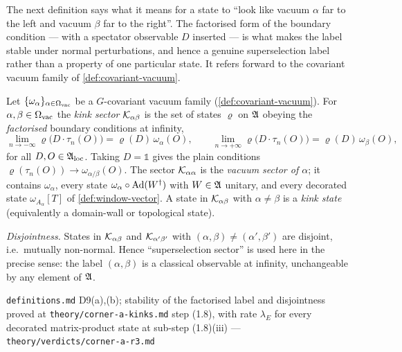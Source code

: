 The next definition says what it means for a state to ``look like vacuum
$\alpha$ far to the left and vacuum $\beta$ far to the right''. The
factorised form of the boundary condition --- with a spectator observable $D$
inserted --- is what makes the label stable under normal perturbations, and
hence a genuine superselection label rather than a property of one particular
state. It refers forward to the covariant vacuum family of
\cref{def:covariant-vacuum}.

\begin{definition}
\label{def:kink-sector}
Let $\{\omega_{\alpha}\}_{\alpha \in \Omega_{\mathrm{vac}}}$ be a $G$-covariant vacuum family
(\cref{def:covariant-vacuum}). For $\alpha, \beta \in \Omega_{\mathrm{vac}}$ the \emph{kink
sector} $\mathcal{K}_{\alpha\beta}$ is the set of states $\varrho$ on $\mathfrak{A}$ obeying
the \emph{factorised} boundary conditions at infinity,
\begin{equation}
  \lim_{n \to -\infty} \varrho\bigl(D \cdot \tau_{n}(O)\bigr)
    = \varrho(D) \, \omega_{\alpha}(O),
  \qquad
  \lim_{n \to +\infty} \varrho\bigl(D \cdot \tau_{n}(O)\bigr)
    = \varrho(D) \, \omega_{\beta}(O),
  \label{eq:kink-boundary-conditions}
\end{equation}
for all $D, O \in \mathfrak{A}_{\mathrm{loc}}$. Taking $D = \mathbb{1}$ gives the plain conditions
$\varrho(\tau_{n}(O)) \to \omega_{\alpha/\beta}(O)$. The sector
$\mathcal{K}_{\alpha\alpha}$ is the \emph{vacuum sector of $\alpha$}; it contains
$\omega_{\alpha}$, every state $\omega_{\alpha} \circ \operatorname{Ad}(W^{\dagger})$ with
$W \in \mathfrak{A}$ unitary, and every decorated state $\omega_{A_{\alpha}}[T]$ of
\cref{def:window-vector}. A state in $\mathcal{K}_{\alpha\beta}$ with $\alpha \neq \beta$
is a \emph{kink state} (equivalently a domain-wall or topological state).

\emph{Disjointness.} States in $\mathcal{K}_{\alpha\beta}$ and
$\mathcal{K}_{\alpha'\beta'}$ with $(\alpha,\beta) \neq (\alpha',\beta')$ are disjoint,
i.e.\ mutually non-normal. Hence ``superselection sector'' is used here in the
precise sense: the label $(\alpha,\beta)$ is a classical observable at
infinity, unchangeable by any element of $\mathfrak{A}$.
\end{definition}

%
{\texttt{definitions.md} D9(a),(b); stability of the factorised label and
 disjointness proved at \texttt{theory/corner-a-kinks.md} step (1.8), with
 rate $\lambda_{E}$ for every decorated matrix-product state at sub-step
 (1.8)(iii)}%
{---}%
{\texttt{theory/verdicts/corner-a-r3.md}}

